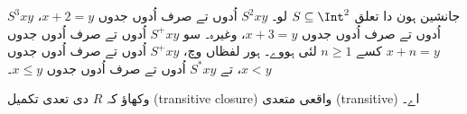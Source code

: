 \documentclass[../../../include/open-logic-section]{subfiles}
\begin{document}
\begin{ex}
جانشین ہون دا تعلق $S \subseteq \Int^2$ لو۔ $S^2xy$ اُدوں تے صرف
اُدوں جدوں $x + 2 = y$، $S^3xy$ اُدوں تے صرف اُدوں جدوں $x + 3 = y$،
وغیرہ۔ سو $S^+xy$ اُدوں تے صرف اُدوں جدوں $x + n = y$ کسے
$n \geq 1$ لئی ہووے۔ ہور لفظاں وچ، $S^+xy$ اُدوں تے صرف اُدوں جدوں
$x < y$، تے $S^*xy$ اُدوں تے صرف اُدوں جدوں $x \le y$۔
\end{ex}

\begin{prob}
وکھاؤ کہ $R$ دی تعدی تکمیل (transitive closure) واقعی متعدی (transitive) اے۔
\end{prob}
\end{document}
